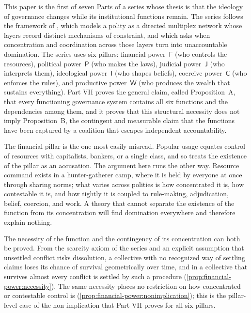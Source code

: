 \documentclass[11pt,letterpaper]{article}
\theoremstyle{definition}
\theoremstyle{remark}
\newcommand{\pF}{\mathsf{F}}
\newcommand{\pP}{\mathsf{P}}
\newcommand{\pJ}{\mathsf{J}}
\newcommand{\pI}{\mathsf{I}}
\newcommand{\pC}{\mathsf{C}}
\newcommand{\pW}{\mathsf{W}}
\begin{document}
This paper is the first of seven Parts of a series whose thesis is that the ideology of governance changes while its institutional functions remain. The series follows the framework of \citet{largo2026hbs}, which models a polity as a directed multiplex network whose layers record distinct mechanisms of constraint, and which asks when concentration and coordination across those layers turn into unaccountable domination. The series uses six pillars: financial power~$\pF$ (who controls the resources), political power~$\pP$ (who makes the laws), judicial power~$\pJ$ (who interprets them), ideological power~$\pI$ (who shapes beliefs), coercive power~$\pC$ (who enforces the rules), and productive power~$\pW$ (who produces the wealth that sustains everything). Part VII \citep{long2026formalized} proves the general claim, called Proposition~A, that every functioning governance system contains all six functions and the dependencies among them, and it proves that this structural necessity does not imply Proposition~B, the contingent and measurable claim that the functions have been captured by a coalition that escapes independent accountability.

The financial pillar is the one most easily misread. Popular usage equates control of resources with capitalists, bankers, or a single class, and so treats the existence of the pillar as an accusation. The argument here runs the other way. Resource command exists in a hunter-gatherer camp, where it is held by everyone at once through sharing norms; what varies across polities is how concentrated it is, how contestable it is, and how tightly it is coupled to rule-making, adjudication, belief, coercion, and work. A theory that cannot separate the existence of the function from its concentration will find domination everywhere and therefore explain nothing.

The necessity of the function and the contingency of its concentration can both be proved. From the scarcity axiom of the series and an explicit assumption that unsettled conflict risks dissolution, a collective with no recognized way of settling claims loses its chance of survival geometrically over time, and in a collective that survives almost every conflict is settled by such a procedure (\cref{prop:financial-power:necessity}). The same necessity places no restriction on how concentrated or contestable control is (\cref{prop:financial-power:nonimplication}); this is the pillar-level case of the non-implication that Part VII proves for all six pillars.
\end{document}
